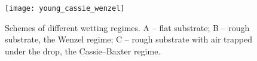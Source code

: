 
\begin{figure}[h]
	\centering
	\texttt{[image: young\_cassie\_wenzel]}
	\caption{Schemes of different wetting regimes. A – flat substrate; B – rough substrate, the Wenzel regime; C – rough substrate with air trapped under the drop, the Cassie–Baxter regime.\cite{Whyman2008}}
	\label{fig:young_cassie_wenzel}
\end{figure}

